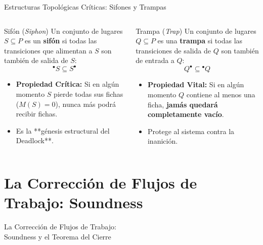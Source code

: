 \documentclass[10pt, aspectratio=169]{beamer}
\begin{document}
\begin{frame}{Estructuras Topológicas Críticas: Sifones y Trampas}
	\begin{columns}
		\begin{alertblock}{Sifón (\emph{Siphon})}
			Un conjunto de lugares $S \subseteq P$ es un \textbf{sifón} si todas las transiciones que alimentan a $S$ son también de salida de $S$:
			\[ {}^\bullet S \subseteq S^\bullet \]
			\begin{itemize}
				\item \textbf{Propiedad Crítica:} Si en algún momento $S$ pierde todas sus fichas ($M(S)=0$), \alert{nunca más podrá recibir fichas}.
				\item Es la **génesis estructural del Deadlock**.
			\end{itemize}
		\end{alertblock}

		\begin{exampleblock}{Trampa (\emph{Trap})}
			Un conjunto de lugares $Q \subseteq P$ es una \textbf{trampa} si todas las transiciones de salida de $Q$ son también de entrada a $Q$:
			\[ Q^\bullet \subseteq {}^\bullet Q \]
			\begin{itemize}
				\item \textbf{Propiedad Vital:} Si en algún momento $Q$ contiene al menos una ficha, \textbf{jamás quedará completamente vacío}.
				\item Protege al sistema contra la inanición.
			\end{itemize}
		\end{exampleblock}
	\end{columns}

	\vspace{0.2cm}
\end{frame}

\section{La Corrección de Flujos de Trabajo: Soundness}

\begin{frame}{}
	\centering
	\Huge{La Corrección de Flujos de Trabajo: \\ Soundness y el Teorema del Cierre}
\end{frame}
\end{document}
